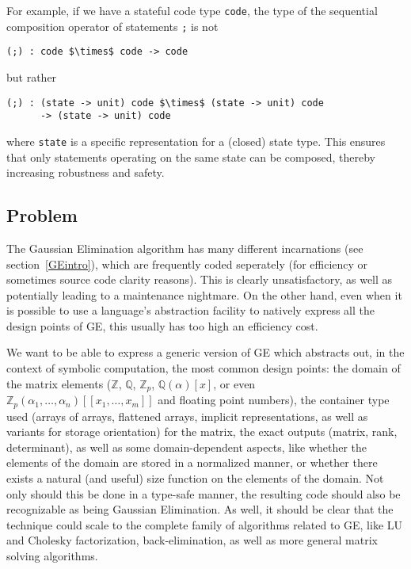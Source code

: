 \documentclass[11pt]{elsart}
\begin{document}
For example, if we have a stateful code type \texttt{code}, the type
of the sequential composition operator of statements \texttt{;} is not
\begin{Verbatim}[commandchars=\\\{\}, 
                 codes={\catcode`$=3\catcode`^=7}]
(;) : code $\times$ code -> code
\end{Verbatim}
but rather
\begin{Verbatim}[commandchars=\\\{\}, 
                 codes={\catcode`$=3\catcode`^=7}]
(;) : (state -> unit) code $\times$ (state -> unit) code 
      -> (state -> unit) code
\end{Verbatim}
where \texttt{state} is a specific representation for a (closed) state type.
This ensures that only statements operating on the same state can be
composed, thereby increasing robustness and safety.

\subsection{Problem}

The Gaussian Elimination algorithm has many different incarnations
(see section~\ref{GEintro}),
which are frequently coded seperately (for efficiency or sometimes
source code clarity reasons).  This is clearly unsatisfactory, as well as
potentially leading to a maintenance nightmare.  On the other hand, 
even when it is possible to use a language's abstraction facility to 
natively express all the design points of GE, this usually has too
high an efficiency cost.

We want to be able to express a generic version of GE which abstracts
out, in the context of symbolic computation, the most common design
points: the domain of the matrix elements ($\mathbb Z$, 
$\mathbb Q$, $\mathbb Z_p$, $\mathbb Q(\alpha)\left[x\right]$, or even
$\mathbb Z_p(\alpha_1,\ldots,\alpha_n)\left[\left[ x_1,\ldots,x_m\right]\right]$
and floating point numbers), the container type used 
(arrays of arrays, flattened arrays, implicit representations, as well 
as variants for storage orientation) for the matrix, the exact 
outputs (matrix, rank, determinant), as well
as some domain-dependent aspects, like whether the elements of the domain
are stored in a normalized manner, or whether there exists a natural (and 
useful) size function on the elements of the domain.  Not only should
this be done in a type-safe manner, the resulting code should also be
recognizable as being Gaussian Elimination.  As well, it should be clear
that the technique could scale to the complete family of algorithms
related to GE, like LU and Cholesky factorization, back-elimination, as
well as more general matrix solving algorithms.
\end{document}
